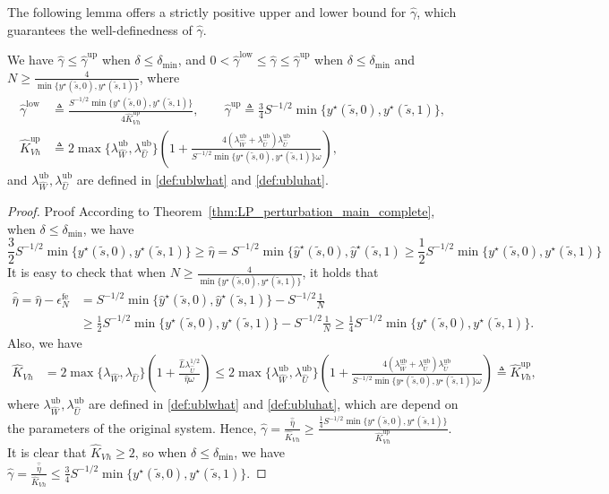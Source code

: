\documentclass[mnsc,nonblindrev]{informs3}
\newcommand{\lwhat}{\lambda_{\widehat{W}}}
\newcommand{\luhat}{\lambda_{\widehat{U}}}
\newcommand{\luhhalf}{\lambda_{\widehat{U}}^{1/2}}
\newcommand{\ublwhat}{\lambda^{\mathrm{ub}}_{\widehat{W}}}
\newcommand{\ubluhat}{\lambda^{\mathrm{ub}}_{\widehat{U}}}
\newcommand{\ubgmhat}{\widehat{\gamma}^{\mathrm{up}}}
\newcommand{\lbgmhat}{\widehat{\gamma}^{\mathrm{low}}}
\newcommand{\ubkhatvh}{\widehat{K}_{Vh}^{\mathrm{up}}}
\newcommand{\etabh}{\widehat{\bar{\eta}}}
\newcommand{\yhat}{\widehat{y}}
\newcommand{\enfe}{\epsilon_N^{\mathrm{fe}}}
\begin{document}
\begin{APPENDICES}
The following lemma offers a strictly positive upper and lower bound for $\widehat \gamma$, which guarantees the well-definedness of $\widehat \gamma$.
\begin{lemma}\label{lem:bound-gammahat}
We have \(\widehat{\gamma}\le\ubgmhat\) when $\delta\le\delta_{\min}$, and \(0<\lbgmhat\le\widehat{\gamma}\le\ubgmhat\) when  $\delta\le\delta_{\min}$ and $N\ge \frac{4}{\min\{y^\star(\tilde{s},0),y^\star(\tilde{s},1)\}}$, where
    \begin{equation}\label{eq:def-lbg-upg-ubKvh}
        \begin{aligned}
            \lbgmhat &\triangleq \frac{S^{-1/2}\min\{y^\star(\tilde{s},0),y^\star(\tilde{s},1)\}}{4\ubkhatvh}, 
            \qquad 
            \ubgmhat \triangleq \frac{3}{4}S^{-1/2}\min\{y^\star(\tilde{s},0),y^\star(\tilde{s},1)\},\\
            \ubkhatvh &\triangleq 2\max\{\ublwhat,\ubluhat\}\left(1+\frac{4(\ublwhat+\ubluhat)\ubluhat}{S^{-1/2}\min\{y^\star(\tilde{s},0),y^\star(\tilde{s},1)\}\omega}\right),
        \end{aligned}
    \end{equation}
    and $\ublwhat,\ubluhat$ are defined in \eqref{def:ublwhat} and \eqref{def:ubluhat}.
\end{lemma}

\begin{proof}{Proof}
According to Theorem~\ref{thm:LP_perturbation_main_complete}, when $\delta\le\delta_{\min}$, we have
\[
\frac{3}{2}S^{-1/2}\min\{y^\star(\tilde{s},0),y^\star(\tilde{s},1)\}\ge\widehat \eta=S^{-1/2}\min\{\yhat^\star(\tilde{s},0),\yhat^\star(\tilde{s},1)\ge\frac{1}{2}S^{-1/2}\min\{y^\star(\tilde{s},0),y^\star(\tilde{s},1)\}
\]
 It is easy to check that when $N\ge \frac{4}{\min\{y^\star(\tilde{s},0),y^\star(\tilde{s},1)\}}$, it holds that
 \begin{align*}
     \etabh=\widehat \eta-\enfe&=S^{-1/2}\min\{\yhat^\star(\tilde{s},0),\yhat^\star(\tilde{s},1)\}-S^{-1/2}\frac{1}{N}\\
     & \ge \frac{1}{2}S^{-1/2}\min\{y^\star(\tilde{s},0),y^\star(\tilde{s},1)\}-S^{-1/2}\frac{1}{N}
     \ge \frac{1}{4}S^{-1/2}\min\{y^\star(\tilde{s},0),y^\star(\tilde{s},1)\}.
 \end{align*}
 Also, we have 
 \[
 \begin{aligned}
     \widehat K_{Vh}&=2\max\{\lwhat,\luhat\}\left(1+\frac{\widehat L\luhhalf}{\widehat\eta\omega}\right)
    \le 2\max\{\ublwhat,\ubluhat\}\left(1+\frac{4(\ublwhat+\ubluhat)\ubluhat}{S^{-1/2}\min\{y^\star(\tilde{s},0),y^\star(\tilde{s},1)\}\omega}\right)\triangleq \ubkhatvh,
 \end{aligned}
\]
where $\ublwhat,\ubluhat$ are defined in \eqref{def:ublwhat} and \eqref{def:ubluhat}, which are depend on the parameters of the original system. Hence,
$
    \widehat \gamma=\frac{\etabh}{\widehat{K}_{Vh}}\ge \frac{\frac{1}{4}S^{-1/2}\min\{y^\star(\tilde{s},0),y^\star(\tilde{s},1)\}}{\ubkhatvh}.
$
It is clear that $\widehat K_{Vh}\ge 2$, so when $\delta\le\delta_{\min}$, we have
$
    \widehat \gamma=\frac{\etabh}{\widehat{K}_{Vh}}\le\frac{3}{4}S^{-1/2}\min\{y^\star(\tilde{s},0),y^\star(\tilde{s},1)\}.
$
\end{proof}


\end{APPENDICES}
\end{document}
